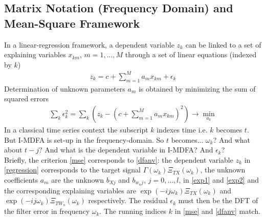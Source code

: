 \documentclass[11pt]{article}
\begin{document}
\subsection{Matrix Notation (Frequency Domain) and Mean-Square Framework}\label{lrms}

In a linear-regression framework, a dependent variable $z_k$ can be linked to a set of explaining variables $x_{km}$, $m=1,...,M$ through a set of linear equations (indexed by $k$)
\begin{eqnarray}\label{regression}
z_k=c+\sum_{m=1}^M a_mx_{km}+\epsilon_k
\end{eqnarray}
Determination of unknown parameters $a_m$ is obtained by minimizing the sum of squared errors
\begin{eqnarray}\label{mse}
\sum_{k}\epsilon_k^2=\sum_k \left(z_k-\left(c+\sum_{m=1}^M a_mx_{km}\right)^2\right)\to \min_{a_k}
\end{eqnarray}
In a classical time series context the subscript $k$ indexes time i.e. $k$ becomes $t$. But I-MDFA is set-up in the frequency-domain. So $t$ becomes... $\omega_k$? And what about $t-j$? And what is the dependent variable in I-MDFA? And $\epsilon_k$?\\

Briefly, the criterion \ref{mse} corresponds to \ref{dfanv}: the dependent variable $z_k$ in \ref{regression} corresponds to the target signal $\Gamma(\omega_k)\Xi_{TX}(\omega_k)$, the unknown coefficients $a_m$ are the unknown $b_{Xj}$ and $b_{w_nj}$, $j=0,...,l$,  in \ref{exp1} and \ref{exp2} and the corresponding explaining variables are $\exp(-ij\omega_k)\Xi_{TX}(\omega_k)$ and $\exp(-ij\omega_k)\Xi_{TW_n}(\omega_k)$ respectively. The residual $\epsilon_k$ must then be the DFT of the filter error in frequency $\omega_k$.  The running indices $k$ in \ref{mse} and \ref{dfanv} match. \\
\end{document}
